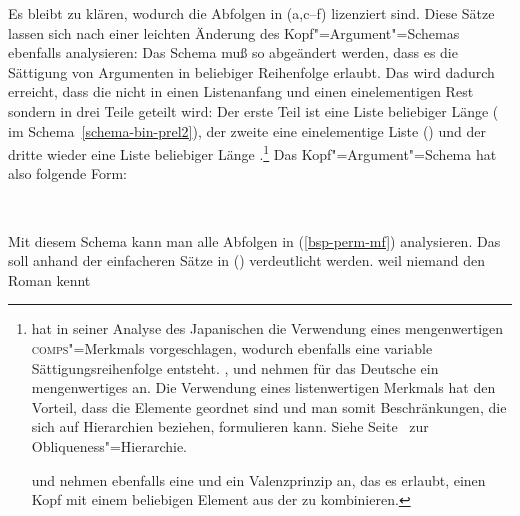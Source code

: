 Es bleibt zu klären, wodurch die Abfolgen in (a,c--f) lizenziert sind. Diese
Sätze lassen sich nach einer leichten Änderung des Kopf"=Argument"=Schemas ebenfalls
analysieren: Das Schema muß so abgeändert werden, dass es die Sättigung von Argumenten
in beliebiger Reihenfolge erlaubt. Das wird dadurch erreicht, dass die \compsl nicht
in einen Listenanfang und einen einelementigen Rest sondern in drei Teile geteilt wird: Der erste
Teil ist eine Liste beliebiger Länge (\, im Schema~\ref{schema-bin-prel2}), der zweite eine einelementige Liste () und der dritte wieder eine
Liste beliebiger Länge .\footnote{
  \citet{Gunji86a} hat in seiner Analyse des Japanischen die Verwendung eines
  mengenwertigen \textsc{comps}"=Merkmals vorgeschlagen, wodurch ebenfalls eine variable Sättigungsreihenfolge
  entsteht. \citet{HN89a}, \citet{Pollard90a} und \citet*{EEU92a} nehmen für das Deutsche
  ein mengenwertiges \compsm an. Die Verwendung eines listenwertigen Merkmals hat den
  Vorteil, dass die Elemente geordnet sind und man somit Beschränkungen, die sich auf
  Hierarchien beziehen, formulieren kann. Siehe Seite~\pageref{page-obliquen-h} zur Obliqueness"=Hierarchie. %

  \citet[]{FR92} und \citet[--223]{Kiss95b} nehmen ebenfalls eine \compsl und ein Valenzprinzip an, das es erlaubt,
  einen Kopf mit einem beliebigen Element aus der \compsl zu kombinieren.%
}
Das Kopf"=Argument"=Schema hat also folgende Form:
\begin{samepage}
\begin{schema}
\label{schema-bin-prel2}
 \impl\\
\end{schema}
\end{samepage}
Mit diesem Schema kann man alle Abfolgen in (\ref{bsp-perm-mf}) analysieren. Das soll
anhand der einfacheren Sätze in () verdeutlicht werden.
\eal
\ex weil niemand den Roman kennt
